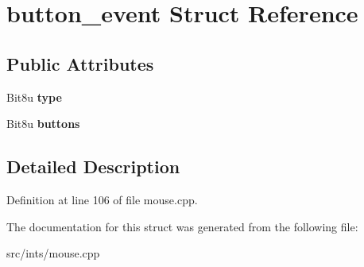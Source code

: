\hypertarget{structbutton__event}{\section{button\-\_\-event Struct Reference}
\label{structbutton__event}
}
\subsection*{Public Attributes}
\begin{DoxyCompactItemize}
\item 
\hypertarget{structbutton__event_a793d0b44cf9339bd85bd3d571830fa51}{Bit8u {\bfseries type}}\label{structbutton__event_a793d0b44cf9339bd85bd3d571830fa51}

\item 
\hypertarget{structbutton__event_abacaa182c19fa91de5e17ee325f6fe88}{Bit8u {\bfseries buttons}}\label{structbutton__event_abacaa182c19fa91de5e17ee325f6fe88}

\end{DoxyCompactItemize}


\subsection{Detailed Description}


Definition at line 106 of file mouse.\-cpp.



The documentation for this struct was generated from the following file\-:\begin{DoxyCompactItemize}
\item 
src/ints/mouse.\-cpp\end{DoxyCompactItemize}
